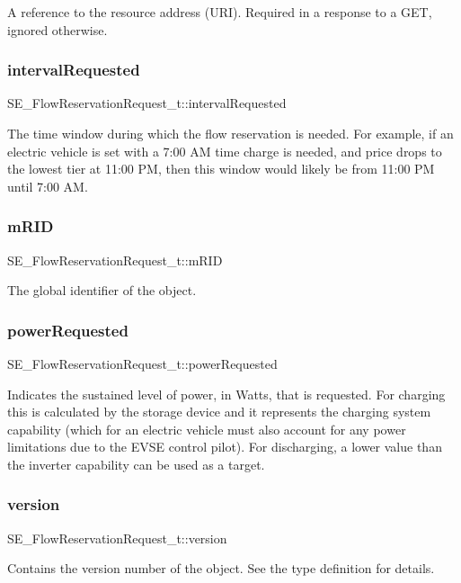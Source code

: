 A reference to the resource address (U\+RI). Required in a response to a G\+ET, ignored otherwise. \mbox{\label{group__FlowReservationRequest_gaae530fc46e3436602dbeb1d39b07b097}} 
\subsubsection{\texorpdfstring{interval\+Requested}{intervalRequested}}
{\footnotesize\ttfamily S\+E\+\_\+\+Flow\+Reservation\+Request\+\_\+t\+::interval\+Requested}

The time window during which the flow reservation is needed. For example, if an electric vehicle is set with a 7\+:00 AM time charge is needed, and price drops to the lowest tier at 11\+:00 PM, then this window would likely be from 11\+:00 PM until 7\+:00 AM. \mbox{\label{group__FlowReservationRequest_ga71989250ddc7ef28b356f8bc3cba85a1}} 
\subsubsection{\texorpdfstring{m\+R\+ID}{mRID}}
{\footnotesize\ttfamily S\+E\+\_\+\+Flow\+Reservation\+Request\+\_\+t\+::m\+R\+ID}

The global identifier of the object. \mbox{\label{group__FlowReservationRequest_ga607d366d123a4f21005c78a04f1739f4}} 
\subsubsection{\texorpdfstring{power\+Requested}{powerRequested}}
{\footnotesize\ttfamily S\+E\+\_\+\+Flow\+Reservation\+Request\+\_\+t\+::power\+Requested}

Indicates the sustained level of power, in Watts, that is requested. For charging this is calculated by the storage device and it represents the charging system capability (which for an electric vehicle must also account for any power limitations due to the E\+V\+SE control pilot). For discharging, a lower value than the inverter capability can be used as a target. \mbox{\label{group__FlowReservationRequest_gad473a8896b755ebbeea7993abb91648e}} 
\subsubsection{\texorpdfstring{version}{version}}
{\footnotesize\ttfamily S\+E\+\_\+\+Flow\+Reservation\+Request\+\_\+t\+::version}

Contains the version number of the object. See the type definition for details. 